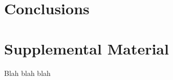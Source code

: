 \documentclass[11pt,a4paper]{article}
\begin{document}
\section{Conclusions}
\label{sec:conclusions}

\nocite{*}



\appendix


\section{Supplemental Material}
\label{sec:supplemental}
Blah blah blah
\end{document}

